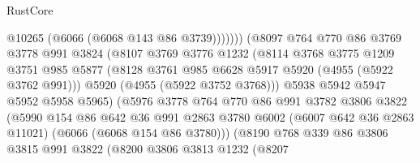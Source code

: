 \begin{lexlean}{RustCore}
\begin{coremodule}
                                      @10265
                                      (@6066 (@6068 @143 @86 @3739)))))))
                            (@8097
                              @764
                              @770
                              @86
                              @3769
                              @3778
                              @991
                              @3824
                              (@8107
                                @3769
                                @3776
                                @1232
                                (@8114
                                  @3768
                                  @3775
                                  @1209
                                  @3751
                                  @985
                                  @5877
                                  (@8128 @3761 @985 @6628 @5917 @5920 (@4955 (@5922 @3762 @991)))
                                  @5920
                                  (@4955 (@5922 @3752 @3768)))
                                @5938
                                @5942
                                @5947
                                @5952
                                @5958
                                @5965)
                              (@5976
                                @3778
                                @764
                                @770
                                @86
                                @991
                                @3782
                                @3806
                                @3822
                                (@5990
                                  @154
                                  @86
                                  @642
                                  @36
                                  @991
                                  @2863
                                  @3780
                                  @6002
                                  (@6007 @642 @36 @2863 @11021)
                                  (@6066 (@6068 @154 @86 @3780)))
                                (@8190
                                  @768
                                  @339
                                  @86
                                  @3806
                                  @3815
                                  @991
                                  @3822
                                  (@8200
                                    @3806
                                    @3813
                                    @1232
                                    (@8207

\end{coremodule}
\end{lexlean}
